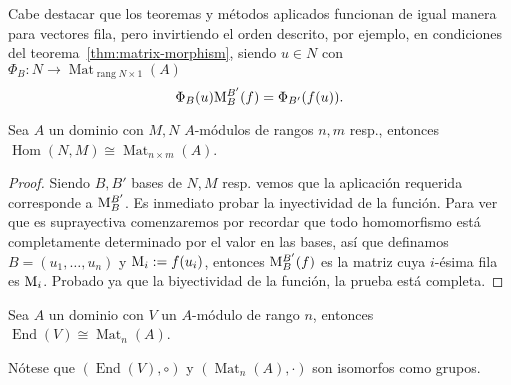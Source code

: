 \documentclass[11pt,oneside]{book}
\DeclareMathOperator{\rang}{rang}
\DeclareMathOperator{\Mat}{Mat}
\DeclareMathOperator{\Hom}{Hom}
\DeclareMathOperator{\End}{End}
\begin{document}
Cabe destacar que los teoremas y métodos aplicados funcionan de igual manera para vectores fila, pero invirtiendo el orden descrito, por ejemplo, en condiciones del teorema~\ref{thm:matrix-morphism}, siendo $u\in N$ con $\Phi_B:N\rightarrow\Mat_{\rang N\times 1}(A)$
$$\Phi_B(u){\rm M}_B^{B'}(f)=\Phi_{B'}(f(u)).$$
\begin{thm}
Sea $A$ un dominio con $M,N$ $A$-módulos de rangos $n,m$ resp., entonces $\Hom(N,M)\cong\Mat_{n\times m}(A)$.
\end{thm}
\begin{proof}
Siendo $B,B'$ bases de $N,M$ resp. vemos que la aplicación requerida corresponde a ${\rm M}_B^{B'}$. Es inmediato probar la inyectividad de la función. Para ver que es suprayectiva comenzaremos por recordar que todo homomorfismo está completamente determinado por el valor en las bases, así que definamos $B=(u_1,\dots,u_n)$ y ${\rm M}_i:=f(u_i)$, entonces ${\rm M}_B^{B'}(f)$ es la matriz cuya $i$-ésima fila es ${\rm M}_i$. Probado ya que la biyectividad de la función, la prueba está completa.
\end{proof}
\begin{cor}
Sea $A$ un dominio con $V$ un $A$-módulo de rango $n$, entonces $\End(V)\cong\Mat_n(A)$.
\end{cor}
Nótese que $(\End(V),\circ)$ y $(\Mat_n(A),\cdot)$ son isomorfos como grupos.
\end{document}
